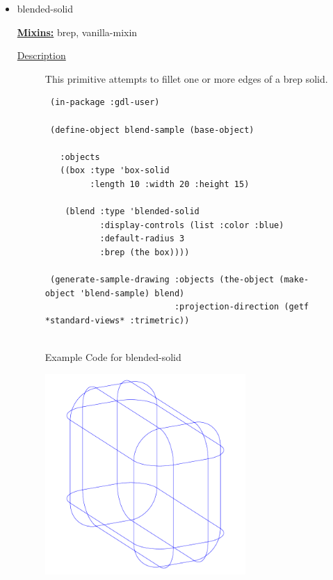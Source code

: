 \documentclass [11pt]{book}
\begin{document}
\begin{itemize}
\item {}blended-solid


\textbf{
\underline{Mixins:}} brep, vanilla-mixin





\begin{description}

\item [
\underline{Description}]


This primitive attempts to fillet one or more edges of a brep solid.



\end{description}




\begin{figure}
\begin{lrbox}{\boxedverb}
\begin{minipage}{\linewidth}
{\small

\begin{verbatim}
 (in-package :gdl-user)

 (define-object blend-sample (base-object)
   
   :objects
   ((box :type 'box-solid
         :length 10 :width 20 :height 15)
   
    (blend :type 'blended-solid
           :display-controls (list :color :blue)
           :default-radius 3
           :brep (the box))))

 (generate-sample-drawing :objects (the-object (make-object 'blend-sample) blend)
                          :projection-direction (getf *standard-views* :trimetric))


\end{verbatim}}
\end{minipage}
\end{lrbox}
\fbox{\usebox{\boxedverb}}

\caption{Example Code for blended-solid}

\label{fig:example-code-blended-solid}

\end{figure}

\begin{figure}
\begin{center}
\includegraphics[width=3in,height=3in]{../images/example-blended-solid.pdf}
\end{center}


\end{figure}
\end{itemize}
\end{document}
